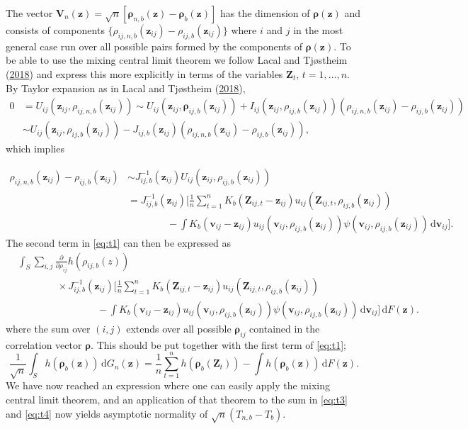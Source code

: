 \documentclass[
  12pt,
  letterpaper]{article}
\numberwithin{equation}{section}
\newcommand{\Z}{\bm{Z}}
\newcommand{\z}{\bm{z}}
\newcommand{\fv}{\bm{v}}
\newcommand{\fV}{\bm{V}}
\newcommand{\frho}{\bm{\rho}}
\newcommand{\di}{\,\textrm{d}}
\begin{document}
The vector \(\fV_n(\z) = \sqrt{n}[\frho_{n,b}(\z)-\frho_b(\z)]\) has the dimension of \(\frho(\z)\) and consists of components \(\{\rho_{ij,n,b}(\z_{ij})-\rho_{ij,b}(\z_{ij})\}\) where \(i\) and \(j\) in the most general case run over all possible pairs formed by the components of \(\frho(\z)\). To be able to use the mixing central limit theorem we follow Lacal and Tjøstheim (\protect\hyperlink{ref-lacal2018estimating}{2018}) and express this more explicitly in terms of the variables \(\Z_{t}\), \(t=1,\ldots,n\). By Taylor expansion as in Lacal and Tjøstheim (\protect\hyperlink{ref-lacal2018estimating}{2018}),
\begin{align*}
0 &= U_{ij}(\z_{ij},\rho_{ij,n,b}(\z_{ij})) \sim  U_{ij}(\z_{ij},\frho_{ij,b}(\z_{ij})) + I_{ij}(\z_{ij},\rho_{ij,b}(\z_{ij}))(\rho_{ij,n,b}(\z_{ij})-\rho_{ij,b}(\z_{ij})) \\
& \sim U_{ij}(\z_{ij},\rho_{ij,b}(\z_{ij})) - J_{ij,b}(\z_{ij})(\rho_{ij,n,b}(\z_{ij})-\rho_{ij,b}(\z_{ij})),
\end{align*}
which implies

\begin{align}
\rho_{ij,n,b}(\z_{ij}) - \rho_{ij,b}(\z_{ij}) & \sim J_{ij,b}^{-1}(\z_{ij})U_{ij}(\z_{ij},\rho_{ij,b}(\z_{ij})) \nonumber \\
& = J_{ij,b}^{-1}(\z_{ij})\Big[\frac{1}{n}\sum_{t=1}^{n} K_b(\Z_{ij,t} - \z_{ij})u_{ij}(\Z_{ij,t},\rho_{ij,b}(\z_{ij})) \nonumber \\
& \qquad\qquad - \int K_b(\fv_{ij} - \z_{ij})u_{ij}(\fv_{ij},\rho_{ij,b}(\z_{ij}))\psi(\fv_{ij}, \rho_{ij,b}(\z_{ij})) \di \fv_{ij}\Big].
\label{eq:t2}
\end{align}
The second term in \eqref{eq:t1} can then be expressed as
\begin{align}
& \int_S \sum_{i,j} \frac{\partial}{\partial \rho_{ij}} h(\rho_{ij,b}(z)) \nonumber \\
& \qquad\qquad \times J_{ij,b}^{-1}(\z_{ij}) \Big[\frac{1}{n}\sum_{t=1}^{n} K_b(\Z_{ij,t}-\z_{ij})u_{ij}(\Z_{ij,t},\rho_{ij,b}(\z_{ij})) \nonumber \\
& \qquad\qquad\qquad\qquad- \int K_b(\fv_{ij}-\z_{ij})u_{ij}(\fv_{ij},\rho_{ij,b}(\z_{ij}))\psi(\fv_{ij},\rho_{ij,b}(\z_{ij})) \di \fv_{ij}\Big] \di F(\z).
\label{eq:t3}
\end{align}
where the sum over \((i,j)\) extends over all possible \(\frho_{ij}\) contained in the correlation vector \(\frho\). This should be put together with the first term of \eqref{eq:t1};
\begin{equation}
\frac{1}{\sqrt{n}} \int_S h(\frho_b(\z)) \di G_n(\z) = \frac{1}{n}\sum_{t=1}^{n}h\left(\frho_b(\Z_{t})\right) - \int h\left(\frho_b(\z)\right) \di F(\z).
\label{eq:t4}
\end{equation}
We have now reached an expression where one can easily apply the mixing central limit theorem, and an application of that theorem to the sum in \eqref{eq:t3} and \eqref{eq:t4} now yields asymptotic normality of \(\sqrt{n}\left(T_{n,b}-T_{b}\right)\).
\end{document}
